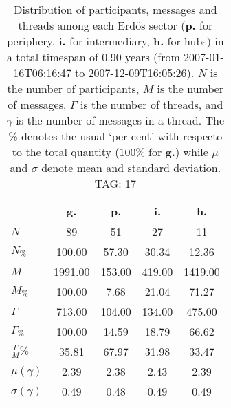 \begin{table}[h!]
\begin{center}
\begin{tabular}{| l || c | c | c | c |}\hline
 & {\bf g.} & {\bf p.} & {\bf i.} & {\bf h.} \\\hline\hline
$N$ & 89  & 51  & 27  & 11 \\
$N_{\%}$ & 100.00  & 57.30  & 30.34  & 12.36 \\\hline
$M$ & 1991.00  & 153.00  & 419.00  & 1419.00 \\
$M_{\%}$ & 100.00  & 7.68  & 21.04  & 71.27 \\\hline
$\Gamma$ & 713.00  & 104.00  & 134.00  & 475.00 \\
$\Gamma_{\%}$ & 100.00  & 14.59  & 18.79  & 66.62 \\\hline
$\frac{\Gamma}{M}\%$ & 35.81  & 67.97  & 31.98  & 33.47 \\
$\mu(\gamma)$ & 2.39  & 2.38  & 2.43  & 2.39 \\
$\sigma(\gamma)$ & 0.49  & 0.48  & 0.49  & 0.49 \\\hline
\end{tabular}
\caption{Distribution of participants, messages and threads among each Erd\"os sector ({\bf p.} for periphery, {\bf i.} for intermediary, 
    {\bf h.} for hubs) in a total timespan of 0.90 years (from 2007-01-16T06:16:47 to 2007-12-09T16:05:26). $N$ is the number of participants, $M$ is the number of messages, $\Gamma$ is the number of threads, and $\gamma$ is the number of messages in a thread.
    The \% denotes the usual `per cent' with respecto to the total quantity ($100\%$ for {\bf g.})
    while $\mu$ and $\sigma$ denote mean and standard deviation. TAG: 17}
\end{center}
\end{table}